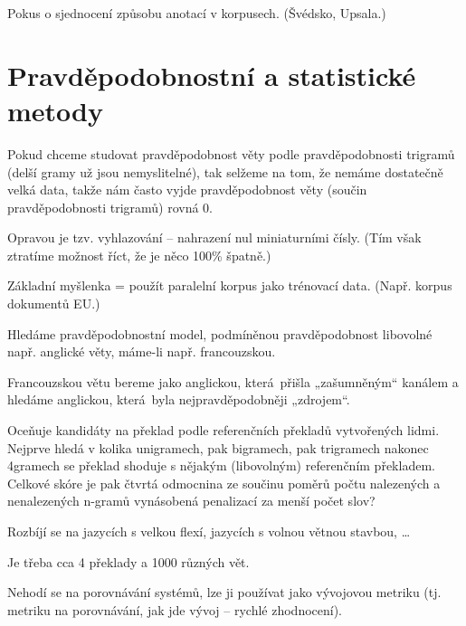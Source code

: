 \documentclass[12pt]{article}					%
\begin{document}
\begin{definice}
	Pokus o sjednocení způsobu anotací v korpusech. (Švédsko, Upsala.)
\end{definice}

\section{Pravděpodobnostní a statistické metody}
\begin{definice}[Vyhlazování]
	Pokud chceme studovat pravděpodobnost věty podle pravděpodobnosti trigramů (delší gramy už jsou nemyslitelné), tak selžeme na tom, že nemáme dostatečně velká data, takže nám často vyjde pravděpodobnost věty (součin pravděpodobnosti trigramů) rovná 0.

	Opravou je tzv. vyhlazování – nahrazení nul miniaturními čísly. (Tím však ztratíme možnost říct, že je něco 100\% špatně.)
\end{definice}

\begin{definice}
	Základní myšlenka = použít paralelní korpus jako trénovací data. (Např. korpus dokumentů EU.) 
\end{definice}

\begin{definice}
	Hledáme pravděpodobnostní model, podmíněnou pravděpodobnost libovolné např. anglické věty, máme-li např. francouzskou.

	Francouzskou větu bereme jako anglickou, která přišla „zašumněným“ kanálem a hledáme anglickou, která byla nejpravděpodobněji „zdrojem“.
\end{definice}

\begin{definice}
	Oceňuje kandidáty na překlad podle referenčních překladů vytvořených lidmi. Nejprve hledá v kolika unigramech, pak bigramech, pak trigramech nakonec 4gramech se překlad shoduje s nějakým (libovolným) referenčním překladem. Celkové skóre je pak čtvrtá odmocnina ze součinu poměrů počtu nalezených a nenalezených n-gramů vynásobená penalizací za menší počet slov?

	Rozbíjí se na jazycích s velkou flexí, jazycích s volnou větnou stavbou, …

	Je třeba cca 4 překlady a 1000 různých vět.

	Nehodí se na porovnávání systémů, lze ji používat jako vývojovou metriku (tj. metriku na porovnávání, jak jde vývoj – rychlé zhodnocení).
\end{definice}
\end{document}
